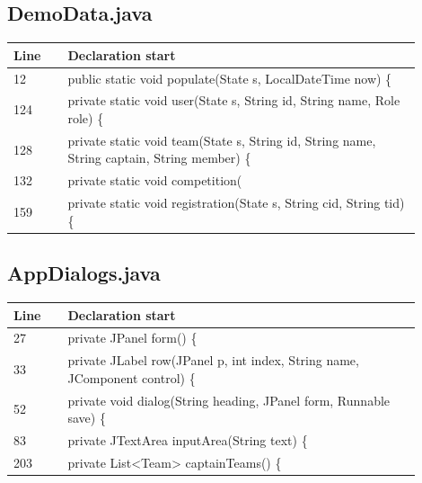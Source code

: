 \subsection*{DemoData.java}
\begin{longtable}{p{0.12\linewidth}p{0.78\linewidth}}\toprule Line & Declaration start\\\midrule\endhead
12 & public static void populate(State s, LocalDateTime now) \{\\
124 & private static void user(State s, String id, String name, Role role) \{\\
128 & private static void team(State s, String id, String name, String captain, String member) \{\\
132 & private static void competition(\\
159 & private static void registration(State s, String cid, String tid) \{\\
\bottomrule\end{longtable}
\subsection*{AppDialogs.java}
\begin{longtable}{p{0.12\linewidth}p{0.78\linewidth}}\toprule Line & Declaration start\\\midrule\endhead
27 & private JPanel form() \{\\
33 & private JLabel row(JPanel p, int index, String name, JComponent control) \{\\
52 & private void dialog(String heading, JPanel form, Runnable save) \{\\
83 & private JTextArea inputArea(String text) \{\\
203 & private List<Team> captainTeams() \{\\
\bottomrule\end{longtable}
